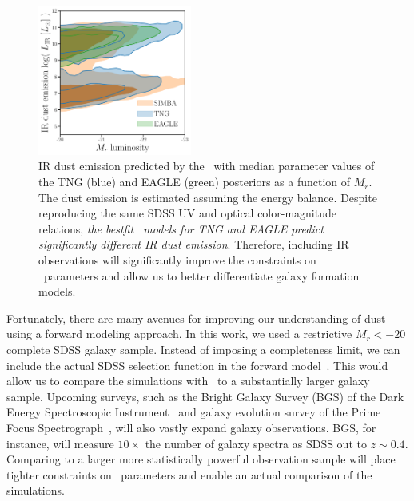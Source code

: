 \begin{figure}
\begin{center}
    \includegraphics[width=0.45\textwidth]{figs/abc_lir.pdf}
    \caption{\label{fig:lir}
    IR dust emission predicted by the \eda~with median parameter values of the
    TNG (blue) and EAGLE (green) posteriors as a function of $M_r$. The dust
    emission is estimated assuming the \cite{dacunha2008} energy balance. 
    Despite reproducing the same SDSS UV and optical color-magnitude relations, 
    \emph{the bestfit \eda~models for TNG and EAGLE predict significantly different
    IR dust emission}. Therefore, including IR observations will significantly
    improve the constraints on \eda~parameters and allow us to better differentiate 
    galaxy formation models. 
    }
\end{center}
\end{figure}

Fortunately, there are many avenues for improving our understanding of dust
using a forward modeling approach. In this work, we used a restrictive $M_r <
-20$ complete SDSS galaxy sample. Instead of imposing a completeness limit, 
we can include the actual SDSS selection function in the forward 
model~\citep[\eg~][]{dickey2020}. This would allow us to compare the
simulations with \eda~to a substantially larger galaxy sample. Upcoming
surveys, such as the Bright Galaxy Survey (BGS) of the Dark Energy
Spectroscopic Instrument~\citep[DESI;][]{desicollaboration2016, ruiz-macias2020} 
and galaxy evolution survey of the Prime Focus
Spectrograph~\citep[PFS;][]{takada2014,tamura2016}, will also vastly expand galaxy
observations. BGS, for instance, will measure $10\times$ the number of galaxy
spectra as SDSS out to $z\sim0.4$. Comparing to a larger more statistically
powerful observation sample will place tighter constraints on \eda~parameters
and enable an actual comparison of the simulations. 


